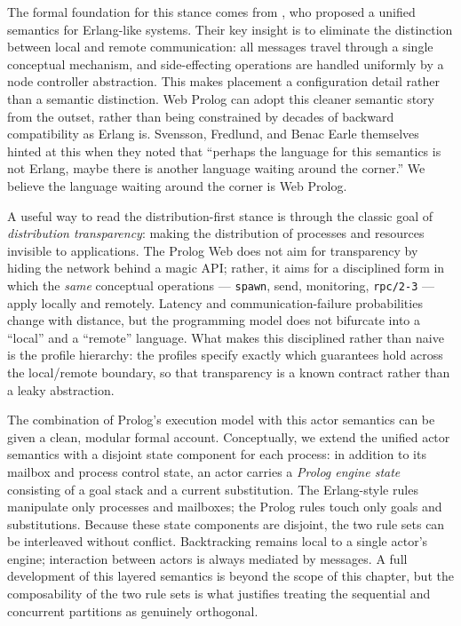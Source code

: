 The formal foundation for this stance comes from
\citet{conf/erlang/SvenssonFE10}, who proposed a unified semantics for
Erlang-like systems. Their key insight is to eliminate the distinction
between local and remote communication: all messages travel through a
single conceptual mechanism, and side-effecting operations are handled
uniformly by a node controller abstraction. This makes placement a
configuration detail rather than a semantic distinction. Web Prolog can
adopt this cleaner semantic story from the outset, rather than being
constrained by decades of backward compatibility as Erlang is.
Svensson, Fredlund, and Benac Earle themselves hinted at this when they
noted that ``perhaps the language for this semantics is not Erlang,
maybe there is another language waiting around the corner.'' We believe
the language waiting around the corner is Web Prolog.

A useful way to read the distribution-first stance is through the
classic goal of \emph{distribution transparency}: making the
distribution of processes and resources invisible to applications. The
Prolog Web does not aim for transparency by hiding the network behind a
magic API; rather, it aims for a disciplined form in which the
\emph{same} conceptual operations --- \texttt{spawn}, send, monitoring,
\texttt{rpc/2-3} --- apply locally and remotely. Latency and
communication-failure probabilities change with distance, but the
programming model does not bifurcate into a ``local'' and a ``remote''
language. What makes this disciplined rather than naive is the profile
hierarchy: the profiles specify exactly which guarantees hold across
the local/remote boundary, so that transparency is a known contract
rather than a leaky abstraction.

The combination of Prolog's execution model with this actor semantics
can be given a clean, modular formal account. Conceptually, we extend
the unified actor semantics with a disjoint state component for each
process: in addition to its mailbox and process control state, an actor
carries a \emph{Prolog engine state} consisting of a goal stack and a
current substitution. The Erlang-style rules manipulate only processes
and mailboxes; the Prolog rules touch only goals and substitutions.
Because these state components are disjoint, the two rule sets can be
interleaved without conflict. Backtracking remains local to a single
actor's engine; interaction between actors is always mediated by
messages. A full development of this layered semantics is beyond the
scope of this chapter, but the composability of the two rule sets is
what justifies treating the sequential and concurrent partitions as
genuinely orthogonal.


